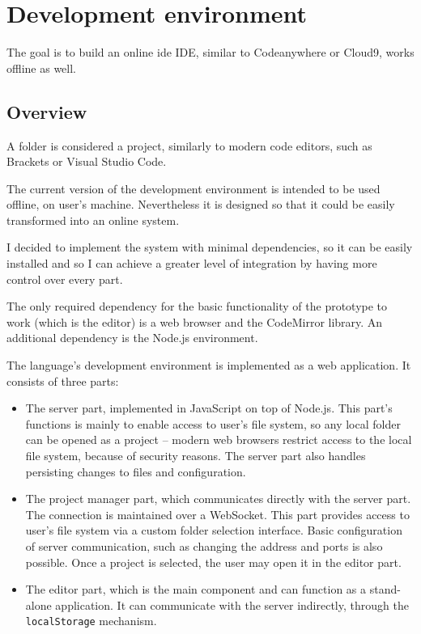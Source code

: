 \chapter{Development environment}\label{chap:editor}
The goal is to build an online \acrlong{ide} IDE, similar to
Codeanywhere\cite{codeanywhere_website} or
Cloud9\cite{c9_website}, works offline as well.

\section{Overview}
A folder is considered a project, similarly to modern code editors, such as
Brackets or Visual Studio Code.

The current version of the development environment is intended to be used
offline, on user's machine. Nevertheless it is designed so that it could be
easily transformed into an online system.

I decided to implement the system with minimal dependencies, so it can be easily
installed and so I can achieve a greater level of integration by having more
control over every part.

The only required dependency for the basic functionality of the prototype to
work (which is the editor) is a web browser and the CodeMirror library. An
additional dependency is the Node.js environment.

The language's development environment is implemented as a web application. It
consists of three parts:
\begin{itemize}
    \item The server part, implemented in JavaScript on top of Node.js. This
      part's functions is mainly to enable access to user's file system, so any
      local folder can be opened as a project -- modern web browsers restrict
      access to the local file system, because of security reasons. The server
      part also handles persisting changes to files and configuration.
    \item The project manager part, which communicates directly with the server
      part. The connection is maintained over a
      WebSocket\cite{mdn_websockets}. This
      part provides access to user's file system via a custom folder selection
      interface. Basic configuration of server communication, such as changing
      the address and ports is also possible. Once a project is selected, the
      user may open it in the editor part.
    \item The editor part, which is the main component and can function as a
      stand-alone application. It can communicate with the server indirectly,
      through the \texttt{localStorage}
      mechanism\cite{mdn_localstorage}.
\end{itemize}

